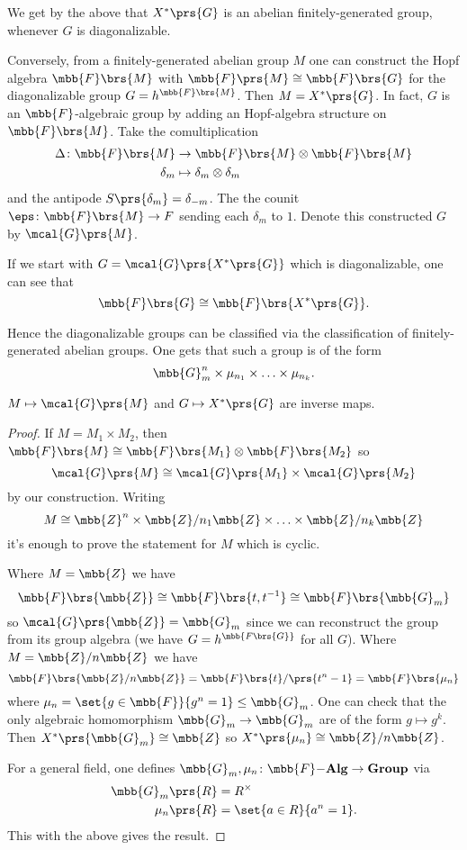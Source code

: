 \documentclass[10pt,a4paper,twoside,openany,hidelinks]{book}
\begin{document}
\begin{remark}
We get by the above that $X^*\prs{G}$ is an abelian finitely-generated group, whenever $G$ is diagonalizable.

Conversely, from a finitely-generated abelian group $M$ one can construct the Hopf algebra $\mbb{F}\brs{M}$ with $\mbb{F}\prs{M} \cong \mbb{F}\brs{G}$ for the diagonalizable group $G = h^{\mbb{F}\brs{M}}$. Then $M = X^*\prs{G}$. In fact, $G$ is an $\mbb{F}$-algebraic group by adding an Hopf-algebra structure on $\mbb{F}\brs{M}$.
Take the comultiplication
\begin{align*}
\Delta \colon \mbb{F}\brs{M} &\to \mbb{F}\brs{M} \otimes \mbb{F}\brs{M} \\
\delta_m &\mapsto \delta_m \otimes \delta_m
\end{align*}
and the antipode $S \prs{\delta_m} = \delta_{-m}$. The the counit
$\eps \colon \mbb{F}\brs{M} \to F$ sending each $\delta_m$ to $1$.
Denote this constructed $G$ by $\mcal{G}\prs{M}$.

If we start with $G = \mcal{G}\prs{X^*\prs{G}}$ which is diagonalizable, one can see that
\[\mbb{F}\brs{G} \cong \mbb{F}\brs{X^*\prs{G}} \text{.}\]

Hence the diagonalizable groups can be classified via the classification of finitely-generated abelian groups. One gets that such a group is of the form
\[\mbb{G}_m^n \times \mu_{n_1} \times \ldots \times \mu_{n_k} \text{.}\]
\end{remark}

\begin{proposition}
$M \mapsto \mcal{G}\prs{M}$ and $G \mapsto X^*\prs{G}$ are inverse maps.
\end{proposition}

\begin{proof}
If $M = M_1 \times M_2$, then
$\mbb{F}\brs{M} \cong \mbb{F}\brs{M_1} \otimes \mbb{F}\brs{M_2}$
so
\[\mcal{G}\prs{M} \cong \mcal{G}\prs{M_1} \times \mcal{G}\prs{M_2}\]
by our construction.
Writing \[M \cong \mbb{Z}^n \times \mbb{Z}/n_1 \mbb{Z} \times \ldots \times \mbb{Z}/n_k \mbb{Z}\]
it's enough to prove the statement for $M$ which is cyclic.

Where $M = \mbb{Z}$ we have
\[\mbb{F}\brs{\mbb{Z}} \cong \mbb{F}\brs{t,t^{-1}} \cong \mbb{F}\brs{\mbb{G}_m}\]
so $\mcal{G}\prs{\mbb{Z}} = \mbb{G}_m$ since we can reconstruct the group from its group algebra (we have $G = h^{\mbb{F\brs{G}}}$ for all $G$).
Where $M = \mbb{Z} / n\mbb{Z}$ we have
\[\mbb{F}\brs{\mbb{Z}/n\mbb{Z}} = \mbb{F}\brs{t} / \prs{t^n - 1} = \mbb{F}\brs{\mu_n}\]
where $\mu_n = \set{g \in \mbb{F}}{g^n = 1} \leq \mbb{G}_m$.
One can check that the only algebraic homomorphism $\mbb{G}_m \to \mbb{G}_m$ are of the form $g \mapsto g^k$. Then $X^*\prs{\mbb{G}_m} \cong \mbb{Z}$ so $X^*\prs{\mu_n} \cong \mbb{Z}/n\mbb{Z}$.

For a general field, one defines $\mbb{G}_m, \mu_n \colon \mbb{F}\mbf{-Alg} \to \mbf{Group}$ via
\begin{align*}
\mbb{G}_m\prs{R} &= R^\times \\
\mu_n\prs{R} &= \set{a \in R}{a^n = 1} \text{.}
\end{align*}
This with the above gives the result.
\end{proof}
\end{document}
